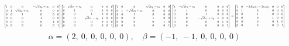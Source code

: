 \documentclass[11pt]{article}
\theoremstyle{definition}
\begin{document}
\[
\scaletoalign{\textwidth}{{\left[\begin{matrix}1 & 0 & 0 & - \sqrt{d} u_{0} + u_{1} & 0 & 0\\0 & 1 & \sqrt{d} u_{0} + u_{1} & 0 & 0 & 0\\0 & 0 & 1 & 0 & 0 & 0\\0 & 0 & 0 & 1 & 0 & 0\\0 & 0 & 0 & 0 & 1 & 0\\0 & 0 & 0 & 0 & 0 & 1\end{matrix}\right]} {\left[\begin{matrix}1 & \sqrt{d} v_{1} + v_{0} & 0 & 0 & 0 & 0\\0 & 1 & 0 & 0 & 0 & 0\\0 & 0 & 1 & 0 & 0 & 0\\0 & 0 & \sqrt{d} v_{1} - v_{0} & 1 & 0 & 0\\0 & 0 & 0 & 0 & 1 & 0\\0 & 0 & 0 & 0 & 0 & 1\end{matrix}\right]} {\left[\begin{matrix}1 & 0 & 0 & \sqrt{d} u_{0} - u_{1} & 0 & 0\\0 & 1 & - \sqrt{d} u_{0} - u_{1} & 0 & 0 & 0\\0 & 0 & 1 & 0 & 0 & 0\\0 & 0 & 0 & 1 & 0 & 0\\0 & 0 & 0 & 0 & 1 & 0\\0 & 0 & 0 & 0 & 0 & 1\end{matrix}\right]} {\left[\begin{matrix}1 & - \sqrt{d} v_{1} - v_{0} & 0 & 0 & 0 & 0\\0 & 1 & 0 & 0 & 0 & 0\\0 & 0 & 1 & 0 & 0 & 0\\0 & 0 & - \sqrt{d} v_{1} + v_{0} & 1 & 0 & 0\\0 & 0 & 0 & 0 & 1 & 0\\0 & 0 & 0 & 0 & 0 & 1\end{matrix}\right]} = {\left[\begin{matrix}1 & 0 & - 2 d u_{0} v_{1} - 2 u_{1} v_{0} & 0 & 0 & 0\\0 & 1 & 0 & 0 & 0 & 0\\0 & 0 & 1 & 0 & 0 & 0\\0 & 0 & 0 & 1 & 0 & 0\\0 & 0 & 0 & 0 & 1 & 0\\0 & 0 & 0 & 0 & 0 & 1\end{matrix}\right]}}
\]
\[
\alpha = \left( 2, \  0, \  0, \  0, \  0, \  0\right), \quad \beta = \left( -1, \  -1, \  0, \  0, \  0, \  0\right)
\]
\end{document}
